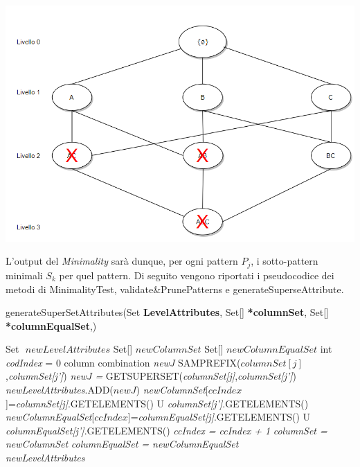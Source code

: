 \begin{center}
	\includegraphics[scale = 0.60]{Immagini/Lattice-taglio.png}\\
\end{center}
L'output del \emph{Minimality} sarà dunque, per ogni pattern $P_j$, i sotto-pattern minimali $S_k$ per quel pattern. Di seguito vengono riportati i pseudocodice dei metodi di MinimalityTest, validate\&PrunePatterns e generateSuperseAttribute.\\
\begin{algorithm}
	\caption{generateSuperSetAttributes(Set \textbf{LevelAttributes}, Set[] \textbf{*columnSet}, Set[] \textbf{*columnEqualSet},)}\label{generatesupersetattributes}
	\begin{algorithmic}[1]	
		
		
		\State Set $\textit{ newLevelAttributes}$
		\State Set[] $\textit{newColumnSet}$
		\State Set[] $\textit{newColumnEqualSet}$
		\State int \textit{codIndex} = 0
		\State column combination \textit{newJ}
		\If SAMPREFIX($columnSet[j]$,\textit{columnSet[j']})
		\State \textit{newJ = }GETSUPERSET(\textit{columnSet[j]},\textit{columnSet[j']})
		\State \textit{newLevelAttributes}.ADD($newJ$)
		\State \textit{newColumnSet}[$ccIndex$]=\textit{columnSet[j]}.GETELEMENTS()
		\State U \textit{columnSet[j']}.GETELEMENTS()
		\State \textit{newColumnEqualSet}[$ccIndex$]=\textit{columnEqualSet[j]}.GETELEMENTS()
		\State U \textit{columnEqualSet[j']}.GETELEMENTS()
		\State \textit{ccIndex = ccIndex + 1}	    
		\EndIf
		\EndFor
		\EndFor
		\State \textit{columnSet = newColumnSet}
		\State \textit{columnEqualSet = newColumnEqualSet}\\
		\Return \textit{newLevelAttributes}
	\end{algorithmic}
\end{algorithm}
